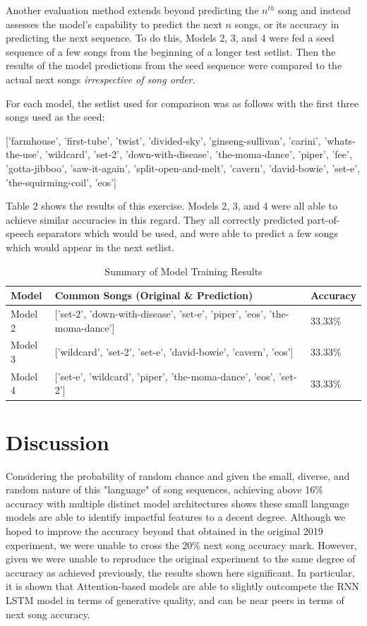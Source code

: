 \documentclass{article}
\begin{document}
Another evaluation method extends beyond predicting the $n^{th}$ song and instead assesses the model's capability to predict the next $n$ songs, or its accuracy in predicting the next sequence. To do this, Models 2, 3, and 4 were fed a seed sequence of a few songs from the beginning of a longer test setlist. Then the results of the model predictions from the seed sequence were compared to the actual next songs \emph{irrespective of song order}. 

For each model, the setlist used for comparison was as follows with the first three songs used as the seed: 

\begin{center}
	['farmhouse', 'first-tube', 'twist', 'divided-sky', 'ginseng-sullivan', 'carini', 'whats-the-use', 'wildcard', 'set-2', 'down-with-disease', 'the-moma-dance', 'piper', 'fee', 'gotta-jibboo', 'saw-it-again', 'split-open-and-melt', 'cavern', 'david-bowie', 'set-e', 'the-squirming-coil', 'eos']
\end{center}

Table 2 shows the results of this exercise. Models 2, 3, and 4 were all able to achieve similar accuracies in this regard. They all correctly predicted part-of-speech separators which would be used, and were able to predict a few songs which would appear in the next setlist. 

\begin{table}
	\caption{Summary of Model Training Results}
	\label{generation-table}
	\centering
	\begin{tabular}{lll}
		\toprule
		Model & Common Songs (Original \& Prediction) & Accuracy \\
		\midrule
		Model 2 & ['set-2', 'down-with-disease', 'set-e', 'piper', 'eos', 'the-moma-dance'] & 33.33\% \\
		Model 3 & ['wildcard', 'set-2', 'set-e', 'david-bowie', 'cavern', 'eos'] & 33.33\% \\
		Model 4 & ['set-e', 'wildcard', 'piper', 'the-moma-dance', 'eos', 'set-2'] & 33.33\% \\
		\bottomrule
	\end{tabular}
\end{table}

\section{Discussion}

Considering the probability of random chance and given the small, diverse, and random nature of this "language" of song sequences, achieving above 16\% accuracy with multiple distinct model architectures shows these small language models are able to identify impactful features to a decent degree. Although we hoped to improve the accuracy beyond that obtained in the original 2019 experiment, we were unable to cross the 20\% next song accuracy mark. However, given we were unable to reproduce the original experiment to the same degree of accuracy as achieved previously, the results shown here significant. In particular, it is shown that Attention-based models are able to slightly outcompete the RNN LSTM model in terms of generative quality, and can be near peers in terms of next song accuracy. 
\end{document}
